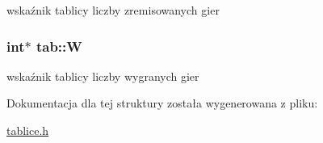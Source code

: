 wskaźnik tablicy liczby zremisowanych gier 

\subsubsection[{\texorpdfstring{W}{W}}]{\setlength{\rightskip}{0pt plus 5cm}int$\ast$ tab\+::W}\hypertarget{structtab_ad2b320d15f1496ed3147a7cdb2e5e1fb}{}\label{structtab_ad2b320d15f1496ed3147a7cdb2e5e1fb}


wskaźnik tablicy liczby wygranych gier 



Dokumentacja dla tej struktury została wygenerowana z pliku\+:\begin{DoxyCompactItemize}
\item 
\hyperlink{tablice_8h}{tablice.\+h}\end{DoxyCompactItemize}
